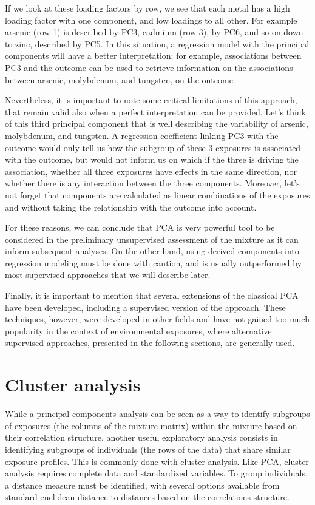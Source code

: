 \documentclass[
]{book}
\begin{document}
If we look at these loading factors by row, we see that each metal has a high loading factor with one component, and low loadings to all other. For example arsenic (row 1) is described by PC3, cadmium (row 3), by PC6, and so on down to zinc, described by PC5.
In this situation, a regression model with the principal components will have a better interpretation; for example, associations between PC3 and the outcome can be used to retrieve information on the associations between arsenic, molybdenum, and tungsten, on the outcome.

Nevertheless, it is important to note some critical limitations of this approach, that remain valid also when a perfect interpretation can be provided. Let's think of this third principal component that is well describing the variability of arsenic, molybdenum, and tungsten. A regression coefficient linking PC3 with the outcome would only tell us how the subgroup of these 3 exposures is associated with the outcome, but would not inform us on which if the three is driving the association, whether all three exposures have effects in the same direction, nor whether there is any interaction between the three components. Moreover, let's not forget that components are calculated as linear combinations of the exposures and without taking the relationship with the outcome into account.

For these reasons, we can conclude that PCA is very powerful tool to be considered in the preliminary unsupervised assessment of the mixture as it can inform subsequent analyses. On the other hand, using derived components into regression modeling must be done with caution, and is usually outperformed by most supervised approaches that we will describe later.

Finally, it is important to mention that several extensions of the classical PCA have been developed, including a supervised version of the approach. These techniques, however, were developed in other fields and have not gained too much popularity in the context of environmental exposures, where alternative supervised approaches, presented in the following sections, are generally used.

\hypertarget{cluster-analysis}{%
\section{Cluster analysis}\label{cluster-analysis}}

While a principal components analysis can be seen as a way to identify subgroups of exposures (the columns of the mixture matrix) within the mixture based on their correlation structure, another useful exploratory analysis consists in identifying subgroups of individuals (the rows of the data) that share similar exposure profiles. This is commonly done with cluster analysis. Like PCA, cluster analysis requires complete data and standardized variables. To group individuals, a distance measure must be identified, with several options available from standard euclidean distance to distances based on the correlations structure.
\end{document}
